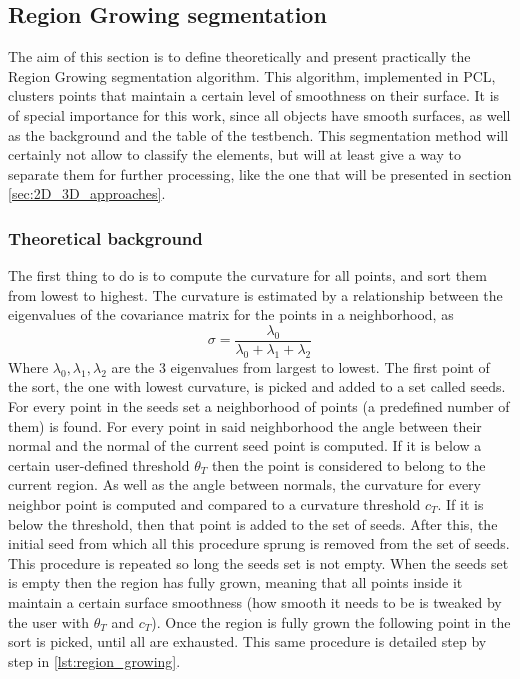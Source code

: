 \documentclass[../main.tex]{subfiles}
\begin{document}
\subsection{Region Growing segmentation} \label{sec:regiongrowing_segmentation}
The aim of this section is to define theoretically and present practically the Region Growing segmentation algorithm. This algorithm, implemented in PCL, clusters points that maintain a certain level of smoothness on their surface. It is of special importance for this work, since all objects have smooth surfaces, as well as the background and the table of the testbench. This segmentation method will certainly not allow to classify the elements, but will at least give a way to separate them for further processing, like the one that will be presented in section \ref{sec:2D_3D_approaches}.

\subsubsection{Theoretical background}
The first thing to do is to compute the curvature for all points, and sort them from lowest to highest. The curvature is estimated by a relationship between the eigenvalues of the covariance matrix for the points in a neighborhood, as
\begin{equation}
    \sigma=\frac{\lambda_{0}}{\lambda_{0}+\lambda_{1}+\lambda_{2}}
\end{equation}
Where $\lambda_{0}, \lambda_{1}, \lambda_{2}$ are the 3 eigenvalues from largest to lowest. The first point of the sort, the one with lowest curvature, is picked and added to a set called seeds. For every point in the seeds set a neighborhood of points (a predefined number of them) is found. For every point in said neighborhood the angle between their normal and the normal of the current seed point is computed. If it is below a certain user-defined threshold $\theta_{T}$ then the point is considered to belong to the current region. As well as the angle between normals, the curvature for every neighbor point is computed and compared to a curvature threshold $c_{T}$. If it is below the threshold, then that point is added to the set of seeds. After this, the initial seed from which all this procedure sprung is removed from the set of seeds. This procedure is repeated so long the seeds set is not empty. When the seeds set is empty then the region has fully grown, meaning that all points inside it maintain a certain surface smoothness (how smooth it needs to be is tweaked by the user with $\theta_{T}$ and $c_{T}$). Once the region is fully grown the following point in the sort is picked, until all are exhausted. This same procedure is detailed step by step in \ref{lst:region_growing}.
\end{document}

